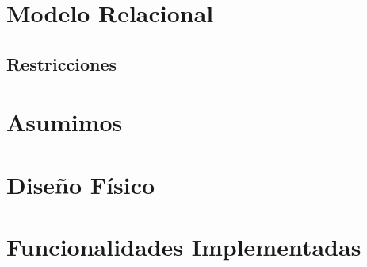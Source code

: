 \documentclass[a4paper, 10pt, twoside]{article}
\begin{document}
\newpage



\section{Modelo Relacional}


\newpage

\subsection{Restricciones}


\newpage




\section{Asumimos}


\newpage



\section{Diseño Físico}
%

\newpage



\section{Funcionalidades Implementadas}
%
\end{document}
